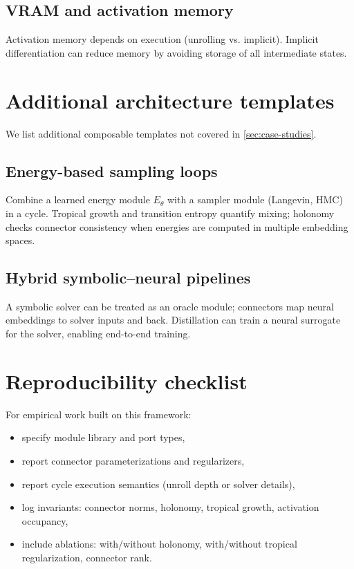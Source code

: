 \documentclass[11pt]{article}
\theoremstyle{definition}
\theoremstyle{plain}
\theoremstyle{remark}
\begin{document}
\subsection{VRAM and activation memory}
Activation memory depends on execution (unrolling vs. implicit).
Implicit differentiation can reduce memory by avoiding storage of all intermediate states.

\section{Additional architecture templates}
\label{app:templates}

We list additional composable templates not covered in \cref{sec:case-studies}.

\subsection{Energy-based sampling loops}
Combine a learned energy module $E_\theta$ with a sampler module (Langevin, HMC) in a cycle.
Tropical growth and transition entropy quantify mixing; holonomy checks connector consistency when energies are computed in multiple embedding spaces.

\subsection{Hybrid symbolic--neural pipelines}
A symbolic solver can be treated as an oracle module; connectors map neural embeddings to solver inputs and back.
Distillation can train a neural surrogate for the solver, enabling end-to-end training.

\section{Reproducibility checklist}
\label{app:repro}

For empirical work built on this framework:
\begin{itemize}[leftmargin=2em]
\item specify module library and port types,
\item report connector parameterizations and regularizers,
\item report cycle execution semantics (unroll depth or solver details),
\item log invariants: connector norms, holonomy, tropical growth, activation occupancy,
\item include ablations: with/without holonomy, with/without tropical regularization, connector rank.
\end{itemize}
\end{document}
